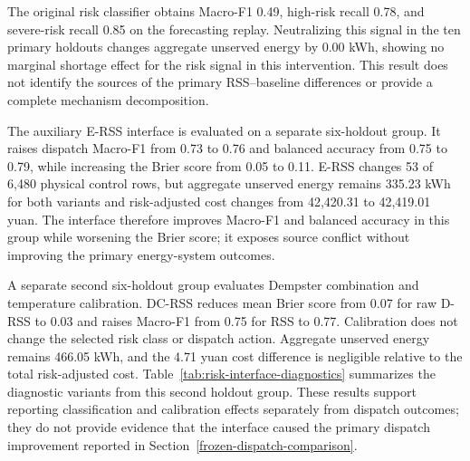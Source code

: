 The original risk classifier obtains Macro-F1 0.49, high-risk recall 0.78, and
severe-risk recall 0.85 on the forecasting replay. Neutralizing this signal in
the ten primary holdouts changes aggregate unserved energy by 0.00 kWh, showing
no marginal shortage effect for the risk signal in this intervention. This
result does not identify the sources of the primary RSS--baseline differences
or provide a complete mechanism decomposition.

The auxiliary E-RSS interface is evaluated on a separate six-holdout group. It
raises dispatch Macro-F1 from 0.73 to 0.76 and balanced accuracy from 0.75 to
0.79, while increasing the Brier score from 0.05 to 0.11. E-RSS changes 53 of
6,480 physical control rows, but aggregate unserved energy remains 335.23 kWh
for both variants and risk-adjusted cost changes from 42,420.31 to 42,419.01
yuan. The interface therefore improves Macro-F1 and balanced accuracy in this
group while worsening the Brier score; it exposes source conflict without
improving the primary energy-system outcomes.

A separate second six-holdout group evaluates Dempster combination and
temperature calibration. DC-RSS reduces mean Brier score from 0.07 for raw
D-RSS to 0.03 and raises Macro-F1 from 0.75 for RSS to 0.77. Calibration does
not change the selected risk class or dispatch action. Aggregate unserved energy
remains 466.05 kWh, and the 4.71 yuan cost difference is negligible relative to
the total risk-adjusted cost. Table~\ref{tab:risk-interface-diagnostics}
summarizes the diagnostic variants from this second holdout group. These results
support reporting classification and calibration effects separately from
dispatch outcomes; they do not provide evidence that the interface caused the
primary dispatch improvement reported in Section~\ref{frozen-dispatch-comparison}.

